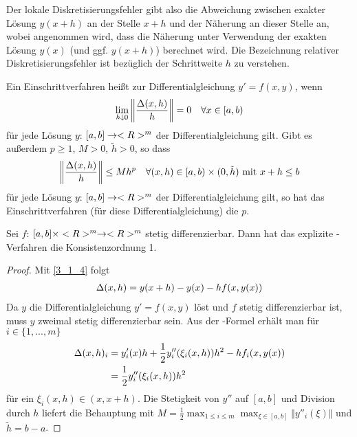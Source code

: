 Der lokale Diskretisierungsfehler gibt also die Abweichung zwischen exakter Lösung $y(x+h)$ an der Stelle $x+h$ und der Näherung an dieser Stelle an, wobei angenommen wird, dass die Näherung unter Verwendung der exakten Lösung $y(x)$ (und ggf. $y(x+h)$) berechnet wird. Die Bezeichnung relativer Diskretisierungsfehler ist bezüglich der Schrittweite $h$ zu verstehen.

\begin{definition}
	Ein Einschrittverfahren heißt  zur Differentialgleichung $y'=f(x,y)$, wenn
	\begin{align}
		\lim\limits_{h\downarrow 0} \left\Vert\frac{\Delta(x,h)}{h}\right\Vert =0\quad\forall x\in [a,b) \notag
	\end{align}
	für jede Lösung $y$: $[a,b]\to<R>^m$ der Differentialgleichung gilt. Gibt es außerdem $p\ge 1$, $M>0$, $\tilde{h}>0$, so dass
	\begin{align}
		\left\Vert\frac{\Delta(x,h)}{h}\right\Vert \le Mh^p\quad\forall (x,h)\in [a,b)\times (0,\tilde{h})\text{ mit } x+h\le b \notag
	\end{align}
	für jede Lösung $y$: $[a,b]\to<R>^m$ der Differentialgleichung gilt, so hat das Einschrittverfahren (für diese Differentialgleichung) die  $p$.
\end{definition}

\begin{proposition}
	Sei $f$: $[a,b]\times <R>^m\to<R>^m$ stetig differenzierbar. Dann hat das explizite -Verfahren die Konsistenzordnung 1.
\end{proposition}
\begin{proof}
	Mit \cref{3_1_4} folgt
	\begin{align}
		\Delta(x,h) = y(x+h) - y(x) - hf(x,y(x)) \notag
	\end{align}
	Da $y$ die Differentialgleichung $y'=f(x,y)$ löst und $f$ stetig differenzierbar ist, muss $y$ zweimal stetig differenzierbar sein. Aus der -Formel erhält man für $i\in\{1,...,m\}$
	\begin{align}
		\Delta(x,h)_i &= y'_i(x)h + \frac{1}{2}y''_i(\xi_i(x,h))h^2 - hf_i(x,y(x)) \notag \\
		&= \frac{1}{2} y''_i(\xi_i(x,h))h^2 \notag
	\end{align}
	für ein $\xi_i(x,h)\in (x,x+h)$. Die Stetigkeit von $y''$ auf $[a,b]$ und Division durch $h$ liefert die Behauptung mit $M=\frac{1}{2}\max_{1\le i\le m}\max_{\xi\in[a,b]}\Vert y''_i(\xi)\Vert$ und $\tilde{h}=b-a$.
\end{proof}

